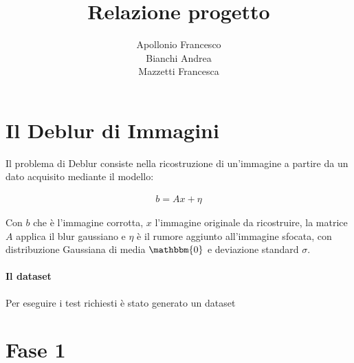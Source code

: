 \documentclass{article}
\title{Relazione progetto}
\author{Apollonio Francesco\\Bianchi Andrea\\Mazzetti Francesca}
\begin{document}
    \maketitle
    \newpage

    \section{Il Deblur di Immagini}

    Il problema di Deblur consiste nella ricostruzione di un'immagine a partire da un dato acquisito mediante il modello:

    \begin{align*}
        b = Ax + \eta
    \end{align*}

    Con $b$ che è l'immagine corrotta, $x$ l'immagine originale da ricostruire, la matrice $A$ applica il blur gaussiano e $\eta$ è il rumore aggiunto all'immagine sfocata, con distribuzione Gaussiana di media $\mathbbm{0}$ e deviazione standard $\sigma$.

    \paragraph{Il dataset}
    Per eseguire i test richiesti è stato generato un dataset 

    \section{Fase 1}
\end{document}
